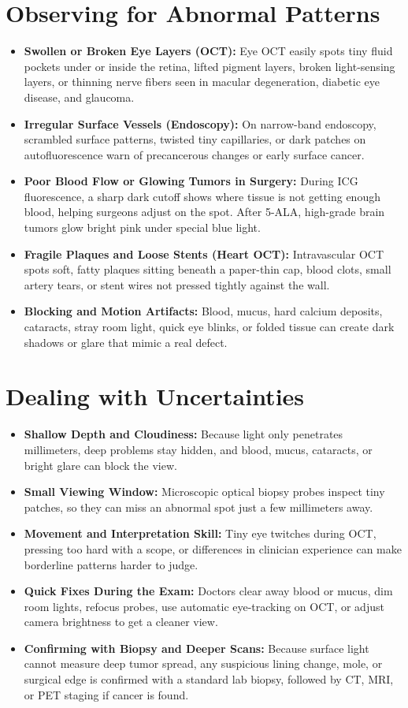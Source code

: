 \section{Observing for Abnormal Patterns}
\begin{itemize}
  \item \textbf{Swollen or Broken Eye Layers (OCT):} Eye OCT easily spots tiny fluid pockets under or inside the retina, lifted pigment layers, broken light-sensing layers, or thinning nerve fibers seen in macular degeneration, diabetic eye disease, and glaucoma.
  \item \textbf{Irregular Surface Vessels (Endoscopy):} On narrow-band endoscopy, scrambled surface patterns, twisted tiny capillaries, or dark patches on autofluorescence warn of precancerous changes or early surface cancer.
  \item \textbf{Poor Blood Flow or Glowing Tumors in Surgery:} During ICG fluorescence, a sharp dark cutoff shows where tissue is not getting enough blood, helping surgeons adjust on the spot. After 5-ALA, high-grade brain tumors glow bright pink under special blue light.
  \item \textbf{Fragile Plaques and Loose Stents (Heart OCT):} Intravascular OCT spots soft, fatty plaques sitting beneath a paper-thin cap, blood clots, small artery tears, or stent wires not pressed tightly against the wall.
  \item \textbf{Blocking and Motion Artifacts:} Blood, mucus, hard calcium deposits, cataracts, stray room light, quick eye blinks, or folded tissue can create dark shadows or glare that mimic a real defect.
\end{itemize}

\section{Dealing with Uncertainties}
\begin{itemize}
  \item \textbf{Shallow Depth and Cloudiness:} Because light only penetrates millimeters, deep problems stay hidden, and blood, mucus, cataracts, or bright glare can block the view.
  \item \textbf{Small Viewing Window:} Microscopic optical biopsy probes inspect tiny patches, so they can miss an abnormal spot just a few millimeters away.
  \item \textbf{Movement and Interpretation Skill:} Tiny eye twitches during OCT, pressing too hard with a scope, or differences in clinician experience can make borderline patterns harder to judge.
  \item \textbf{Quick Fixes During the Exam:} Doctors clear away blood or mucus, dim room lights, refocus probes, use automatic eye-tracking on OCT, or adjust camera brightness to get a cleaner view.
  \item \textbf{Confirming with Biopsy and Deeper Scans:} Because surface light cannot measure deep tumor spread, any suspicious lining change, mole, or surgical edge is confirmed with a standard lab biopsy, followed by CT, MRI, or PET staging if cancer is found.
\end{itemize}

